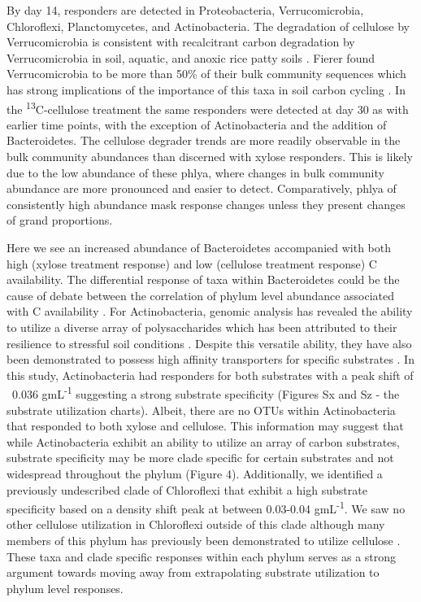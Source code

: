 By day 14, responders are detected in Proteobacteria, Verrucomicrobia, Chloroflexi, Planctomycetes, and Actinobacteria. The degradation of cellulose by Verrucomicrobia is consistent with recalcitrant carbon degradation by Verrucomicrobia in soil, aquatic, and anoxic rice patty soils \cite{Fierer_2013,Herlemann_2013,10543821}. Fierer found Verrucomicrobia to be more than 50\% of their bulk community sequences which has strong implications of the importance of this taxa in soil carbon cycling \cite{Fierer_2013}. In the \textsuperscript{13}C-cellulose treatment the same responders were detected at day 30 as with earlier time points, with the exception of Actinobacteria and the addition of Bacteroidetes. The cellulose degrader trends are more readily observable in the bulk community abundances than discerned with xylose responders. This is likely due to the low abundance of these phlya, where changes in bulk community abundance are more pronounced and easier to detect. Comparatively, phlya of consistently high abundance mask response changes unless they present changes of grand proportions.          



Here we see an increased abundance of Bacteroidetes accompanied with both high (xylose treatment response) and low (cellulose treatment response) C availability. The differential response of taxa within Bacteroidetes could be the cause of debate between the correlation of phylum level abundance associated with C availability \cite{Fierer_2007,Rui_2009,Sharp_2000,L_pez_Lozano_2013,Bastian_2009}. For Actinobacteria, genomic analysis has revealed the ability to utilize a diverse array of polysaccharides which has been attributed to their resilience to stressful soil conditions \cite{Trivedi_2013}. Despite this versatile ability, they have also been demonstrated to possess high affinity transporters for specific substrates \cite{Trivedi_2013}. In this study, Actinobacteria had responders for both substrates with a peak shift of ~0.036 gmL\textsuperscript{-1} suggesting a strong substrate specificity (Figures Sx and Sz - the substrate utilization charts). Albeit, there are no OTUs within Actinobacteria that responded to both xylose and cellulose. This information may suggest that while Actinobacteria exhibit an ability to utilize an array of carbon substrates, substrate specificity may be more clade specific for certain substrates and not widespread throughout the phylum (Figure 4). Additionally, we identified a previously undescribed clade of Chloroflexi that exhibit a high substrate specificity based on a density shift peak at between 0.03-0.04 gmL\textsuperscript{-1}.  We saw no other cellulose utilization in Chloroflexi outside of this clade although many members of this phylum has previously been demonstrated to utilize cellulose \cite{Goldfarb_2011,Cole_2013,Hug_2013}. These taxa and clade specific responses within each phylum serves as a strong argument towards moving away from extrapolating substrate utilization to phylum level responses.

